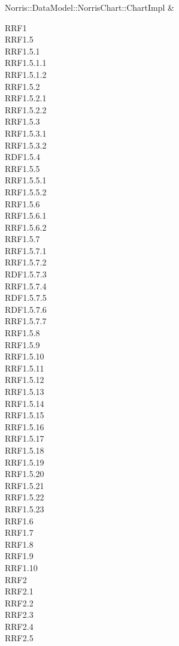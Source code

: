 \begin{longtabu}
                Norris::DataModel::NorrisChart::ChartImpl & \parbox[t]{8cm}{ RRF1 \\ RRF1.5 \\ RRF1.5.1 \\ RRF1.5.1.1 \\ RRF1.5.1.2 \\ RRF1.5.2 \\ RRF1.5.2.1 \\ RRF1.5.2.2 \\ RRF1.5.3 \\ RRF1.5.3.1 \\ RRF1.5.3.2 \\ RDF1.5.4 \\ RRF1.5.5 \\ RRF1.5.5.1 \\ RRF1.5.5.2 \\ RRF1.5.6 \\ RRF1.5.6.1 \\ RRF1.5.6.2 \\ RRF1.5.7 \\ RRF1.5.7.1 \\ RRF1.5.7.2 \\ RDF1.5.7.3 \\ RRF1.5.7.4 \\ RDF1.5.7.5 \\ RDF1.5.7.6 \\ RRF1.5.7.7 \\ RRF1.5.8 \\ RRF1.5.9 \\ RRF1.5.10 \\ RRF1.5.11 \\ RRF1.5.12 \\ RRF1.5.13 \\ RRF1.5.14 \\ RRF1.5.15 \\ RRF1.5.16 \\ RRF1.5.17 \\ RRF1.5.18 \\ RRF1.5.19 \\ RRF1.5.20 \\ RRF1.5.21 \\ RRF1.5.22 \\ RRF1.5.23 \\ RRF1.6 \\ RRF1.7 \\ RRF1.8 \\ RRF1.9 \\ RRF1.10 \\ RRF2 \\ RRF2.1 \\ RRF2.2 \\ RRF2.3 \\ RRF2.4 \\ RRF2.5} \\ \hline

\end{longtabu}
